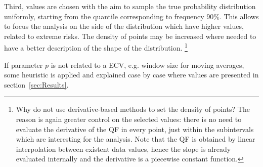 Third, values are chosen with the aim to sample the true probability distribution uniformly, starting from the quantile corresponding to frequency 90\%. This allows to focus the analysis on the side of the distribution which have higher values, related to extreme \glspl{risk}. The density of points may be increased where needed to have a better description of the shape of the distribution.%
\footnote{Why do not use derivative-based methods to set the density of points? The reason is again greater control on the selected values: there is no need to evaluate the derivative of the \gls{QF} in every point, just within the subintervals which are interesting for the analysis. Note that the \gls{QF} is obtained by linear interpolation between existent data values, hence the slope is already evaluated internally and the derivative is a piecewise constant function.}

If parameter $p$ is not related to a \gls{ECV}, e.g. window size for moving averages, some heuristic is applied and explained case by case where values are presented in section~\ref{sec:Results}.

